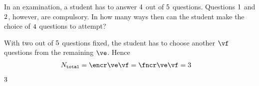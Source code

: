 


\question[1] In an examination, a student has to answer $4$ out of $5$ questions. Questions $1$ 
and $2$, however, are compulsory. In how many ways then can the student make the choice of $4$ questions 
to attempt?

\watchout[-20pt]

\begin{solution}[\mcq]
	With two out of $5$ questions fixed, the student has to choose another $\vf$ questions 
	from the remaining $\ve$. Hence
	\begin{align}
		N_{\texttt{total}} &= \encr\ve\vf = \fncr\ve\vf = \vg
	\end{align}
\end{solution}

\ifprintanswers
  \begin{codex}
    $3$
  \end{codex}
\fi 

